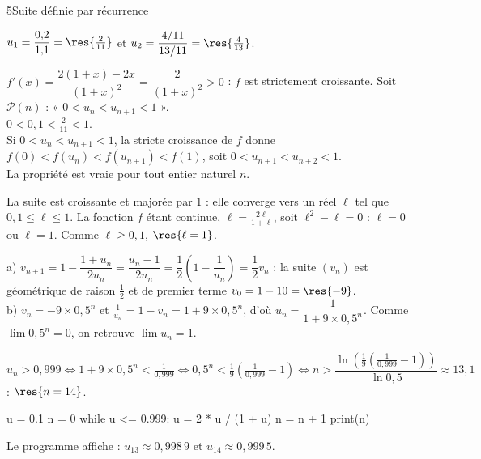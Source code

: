 \begin{corrigeBac}{5}{Suite définie par récurrence}
\begin{questions}
  \item $u_1=\dfrac{0{,}2}{1{,}1}=\res{\tfrac{2}{11}}$ et $u_2=\dfrac{4/11}{13/11}=\res{\tfrac{4}{13}}$. 
  \item $f'(x)=\dfrac{2(1+x)-2x}{(1+x)^{2}}=\dfrac{2}{(1+x)^{2}}>0$ : $f$ est strictement croissante. Soit $\mathcal{P}(n)$ :
    « $0<u_n<u_{n+1}<1$ ».\\
     $0<0{,}1<\frac2{11}<1$.\\
     Si $0<u_n<u_{n+1}<1$, la stricte croissance de $f$ donne $f(0)<f(u_n)<f(u_{n+1})<f(1)$, soit
    $0<u_{n+1}<u_{n+2}<1$.\\
     La propriété est vraie pour tout entier naturel $n$. 
  \item La suite est croissante et majorée par $1$ : elle converge vers un réel $\ell$ tel que $0{,}1\leq\ell\leq1$. La fonction $f$ étant
    continue, $\ell=\frac{2\ell}{1+\ell}$, soit $\ell^{2}-\ell=0$ : $\ell=0$ ou $\ell=1$. Comme $\ell\geq0{,}1$, $\res{\ell=1}$. \pts{1 pt}
  \item a) $v_{n+1}=1-\dfrac{1+u_n}{2u_n}=\dfrac{u_n-1}{2u_n}=\dfrac12\left(1-\dfrac1{u_n}\right)=\dfrac12v_n$ : la suite $(v_n)$ est
    géométrique de raison $\frac12$ et de premier terme $v_0=1-10=\res{-9}$.\\
    b) $v_n=-9\times0{,}5^{n}$ et $\frac1{u_n}=1-v_n=1+9\times0{,}5^{n}$, d'où $u_n=\dfrac{1}{1+9\times0{,}5^{n}}$. Comme
    $\lim0{,}5^{n}=0$, on retrouve $\lim u_n=1$. 
  \item $u_n>0{,}999\iff1+9\times0{,}5^{n}<\frac{1}{0{,}999}\iff0{,}5^{n}<\frac19\left(\frac{1}{0{,}999}-1\right)\iff
    n>\dfrac{\ln\left(\frac19\left(\frac1{0{,}999}-1\right)\right)}{\ln0{,}5}\approx13{,}1$ : $\res{n=14}$.
\begin{codecote}[0.42]
\begin{pythoncol}
u = 0.1
n = 0
while u <= 0.999:
    u = 2 * u / (1 + u)
    n = n + 1
print(n)
\end{pythoncol}
\cote
Le programme affiche  : $u_{13}\approx0{,}998\,9$ et $u_{14}\approx0{,}999\,5$.
\end{codecote}
\end{questions}
\end{corrigeBac}

